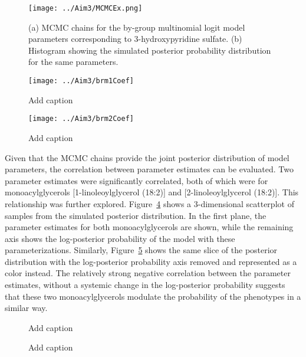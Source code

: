 \newpage
{}
\recalctypearea
\begin{figure}[H]
	\texttt{[image: ../Aim3/MCMCEx.png]}
	\caption[3-hydroxypyridine sulfate estimate]{(a) MCMC chains for the by-group multinomial logit model parameters corresponding to 3-hydroxypyridine sulfate. (b) Histogram showing the simulated posterior probability distribution for the same parameters. \label{fig:brm1Coef} }
\end{figure}
\newpage
\begin{figure}[H]
	\texttt{[image: ../Aim3/brm1Coef]}
	\caption[Add caption]{Add caption \label{fig:brm1Coef} }
\end{figure}
\newpage
\begin{figure}[H]
	\texttt{[image: ../Aim3/brm2Coef]}
	\caption[Add caption]{Add caption \label{fig:brm2Coef} }
\end{figure}
\newpage
{}
\recalctypearea

\begin{DoubleSpace*}
Given that the MCMC chains provide the joint posterior distribution of model parameters, the correlation between parameter estimates can be evaluated. Two parameter estimates were significantly correlated, both of which were for monoacylglycerols [1-linoleoylglycerol (18:2)] and [2-linoleoylglycerol (18:2)]. This relationship was further explored. Figure~\ref{fig:coefPost} shows a 3-dimensional scatterplot of samples from the simulated posterior distribution. In the first plane, the parameter estimates for both monoacylglycerols are shown, while the remaining axis shows the log-posterior probability of the model with these parameterizations.  Similarly, Figure~\ref{fig:coefPost2} shows the same slice of the posterior distribution with the log-posterior probability axis removed and represented as a color instead. The relatively strong negative correlation between the parameter estimates, without a systemic change in the log-posterior probability suggests that these two monoacylglycerols modulate the probability of the phenotypes in a similar way. 
\end{DoubleSpace*}
\begin{figure}[H]
	\caption[Add caption]{Add caption \label{fig:coefPost} }
\end{figure}

\begin{figure}[H]
	\caption[Add caption]{Add caption \label{fig:coefPost2} }
\end{figure}

